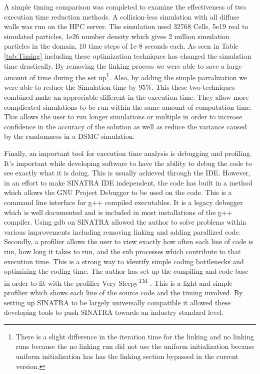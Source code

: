 \indent A simple timing comparison was completed to examine the effectiveness of two execution time reduction methods. A collision-less simulation with all diffuse walls was run on the HPC server. The simulation used 32768 Cells, 5e19 real to simulated particles, 1e26 number density which gives 2 million simulation particles in the domain, 10 time steps of 1e-8 seconds each. As seen in Table \ref{tab:Timing} including these optimization techniques has changed the simulation time drastically. By removing the linking process we were able to save a large amount of time during the set up\footnote{There is a slight difference in the iteration time for the linking and no linking runs because the no linking run did not use the uniform initialization because uniform initialization has has the linking section bypassed in the current version.}. Also, by adding the simple parralization we were able to reduce the Simulation time by 95\%. This these two techniques combined make an appreciable different in the execution time. They allow more complicated simulations to be run within the same amount of computation time. This allows the user to run longer simulations or multiple in order to increase confidence in the accuracy of the solution as well as reduce the variance caused by the randomness in a DSMC simulation. \par

\indent Finally, an important tool for execution time analysis is debugging and profiling. It's important while developing software to have the ability to debug the code to see exactly what it is doing. This is usually achieved through the IDE. However, in an effort to make SINATRA IDE independent, the code has built in a method which allows the GNU Project Debugger to be used on the code\cite{gdb}. This is a command line interface for g++ compiled executables. It is a legacy debugger which is well documented and is included in most installations of the g++ compiler. Using gdb on SINATRA allowed the author to solve problems within various improvements including removing linking and adding parallized code. Secondly, a profilier allows the user to view exactly how often each line of code is run, how long it takes to run, and the sub processes which contribute to that execution time. This is a strong way to identify simple coding bottlenecks and optimizing the coding time. The author has set up the compiling and code base in order to fit with the profilier Very Sleepy\textsuperscript{TM} \cite{Sleepy}. This is a light and simple profilier which shows each line of the source code and the timing involved. By setting up SINATRA to be largely universally compatible it allowed these developing tools to push SINATRA towards an industry standard level. \par



